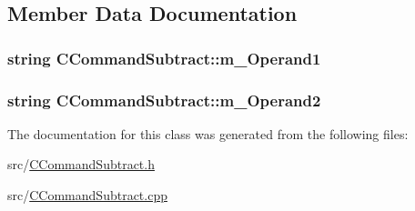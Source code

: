 \subsection{Member Data Documentation}
\subsubsection[{\texorpdfstring{m\+\_\+\+Operand1}{m_Operand1}}]{\setlength{\rightskip}{0pt plus 5cm}string C\+Command\+Subtract\+::m\+\_\+\+Operand1\hspace{0.3cm}{\ttfamily [private]}}\hypertarget{classCCommandSubtract_ac0de4d1a69b9467aa080b8b46635d458}{}\label{classCCommandSubtract_ac0de4d1a69b9467aa080b8b46635d458}
\subsubsection[{\texorpdfstring{m\+\_\+\+Operand2}{m_Operand2}}]{\setlength{\rightskip}{0pt plus 5cm}string C\+Command\+Subtract\+::m\+\_\+\+Operand2\hspace{0.3cm}{\ttfamily [private]}}\hypertarget{classCCommandSubtract_a2da0355a6682b78cb62992fbb6fba499}{}\label{classCCommandSubtract_a2da0355a6682b78cb62992fbb6fba499}


The documentation for this class was generated from the following files\+:\begin{DoxyCompactItemize}
\item 
src/\hyperlink{CCommandSubtract_8h}{C\+Command\+Subtract.\+h}\item 
src/\hyperlink{CCommandSubtract_8cpp}{C\+Command\+Subtract.\+cpp}\end{DoxyCompactItemize}
